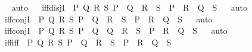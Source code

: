 \begin{isabellebody}
\isadelimproof
\ %
\endisadelimproof
%
\isatagproof
{}\isamarkupfalse%
\ auto%
\endisatagproof
{\isafoldproof}%
%
\isadelimproof
%
\endisadelimproof
\ \isanewline
{}\isamarkupfalse%
\ iff{\isacharunderscore}{\kern0pt}disjI\ {\isacharcolon}{\kern0pt}\ {\isachardoublequoteopen}{\isasymAnd}P\ Q\ R\ S{\isachardot}{\kern0pt}\ P\ {\isasymlongleftrightarrow}\ Q\ {\isasymLongrightarrow}\ R\ {\isasymlongleftrightarrow}\ S\ {\isasymLongrightarrow}\ P\ {\isasymor}\ R\ {\isasymlongleftrightarrow}\ Q\ {\isasymor}\ S{\isachardoublequoteclose}%
\isadelimproof
\ %
\endisadelimproof
%
\isatagproof
{}\isamarkupfalse%
\ auto%
\endisatagproof
{\isafoldproof}%
%
\isadelimproof
%
\endisadelimproof
\isanewline
{}\isamarkupfalse%
\ iff{\isacharunderscore}{\kern0pt}conjI\ {\isacharcolon}{\kern0pt}\ {\isachardoublequoteopen}{\isasymAnd}P\ Q\ R\ S{\isachardot}{\kern0pt}\ P\ {\isasymlongleftrightarrow}\ Q\ {\isasymLongrightarrow}\ R\ {\isasymlongleftrightarrow}\ S\ {\isasymLongrightarrow}\ P\ {\isasymand}\ R\ {\isasymlongleftrightarrow}\ Q\ {\isasymand}\ S{\isachardoublequoteclose}%
\isadelimproof
\ %
\endisadelimproof
%
\isatagproof
{}\isamarkupfalse%
\ auto%
\endisatagproof
{\isafoldproof}%
%
\isadelimproof
%
\endisadelimproof
\isanewline
{}\isamarkupfalse%
\ iff{\isacharunderscore}{\kern0pt}conjI{}\ {\isacharcolon}{\kern0pt}\ {\isachardoublequoteopen}{\isasymAnd}P\ Q\ R\ S{\isachardot}{\kern0pt}\ P\ {\isasymlongleftrightarrow}\ Q\ {\isasymLongrightarrow}\ {\isacharparenleft}{\kern0pt}Q\ {\isasymLongrightarrow}\ R\ {\isasymlongleftrightarrow}\ S{\isacharparenright}{\kern0pt}\ {\isasymLongrightarrow}\ {\isacharparenleft}{\kern0pt}P\ {\isasymand}\ R\ {\isasymlongleftrightarrow}\ Q\ {\isasymand}\ S{\isacharparenright}{\kern0pt}{\isachardoublequoteclose}%
\isadelimproof
\ %
\endisadelimproof
%
\isatagproof
{}\isamarkupfalse%
\ auto%
\endisatagproof
{\isafoldproof}%
%
\isadelimproof
%
\endisadelimproof
\ \isanewline
{}\isamarkupfalse%
\ iff{\isacharunderscore}{\kern0pt}iff\ {\isacharcolon}{\kern0pt}\ {\isachardoublequoteopen}{\isasymAnd}P\ Q\ R\ S{\isachardot}{\kern0pt}\ P\ {\isasymlongleftrightarrow}\ Q\ {\isasymLongrightarrow}\ R\ {\isasymlongleftrightarrow}\ S\ {\isasymLongrightarrow}\ {\isacharparenleft}{\kern0pt}P\ {\isasymlongleftrightarrow}\ R{\isacharparenright}{\kern0pt}\ {\isasymlongleftrightarrow}\ {\isacharparenleft}{\kern0pt}Q\ {\isasymlongleftrightarrow}\ S{\isacharparenright}{\kern0pt}{\isachardoublequoteclose}%
\isadelimproof
\ %
\endisadelimproof

\end{isabellebody}

